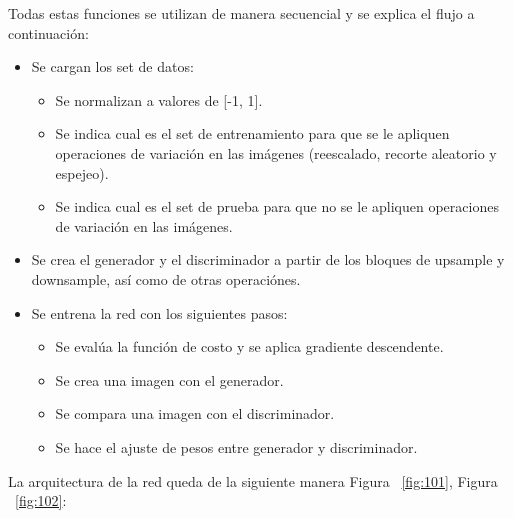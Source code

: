 \documentclass[10pt,journal,compsoc]{IEEEtran}\usepackage[T1]{fontenc}                              %
\begin{document}
Todas estas funciones se utilizan de manera secuencial y se explica el
flujo a continuación:

\begin{itemize}
\item
  Se cargan los set de datos:

  \begin{itemize}
  \item
    Se normalizan a valores de {[}-1, 1{]}.
  \item
    Se indica cual es el set de entrenamiento para que se le apliquen
    operaciones de variación en las imágenes (reescalado, recorte
    aleatorio y espejeo).
  \item
    Se indica cual es el set de prueba para que no se le apliquen
    operaciones de variación en las imágenes.
  \end{itemize}
\item
  Se crea el generador y el discriminador a partir de los bloques de
  upsample y downsample, así como de otras operaciónes.
\item
  Se entrena la red con los siguientes pasos:

  \begin{itemize}
  \item
    Se evalúa la función de costo y se aplica gradiente descendente.
  \item
    Se crea una imagen con el generador.
  \item
    Se compara una imagen con el discriminador.
  \item
    Se hace el ajuste de pesos entre generador y discriminador.
  \end{itemize}
\end{itemize}

La arquitectura de la red queda de la siguiente manera Figura ~\ref{fig:101}, Figura ~\ref{fig:102}:
\end{document}
